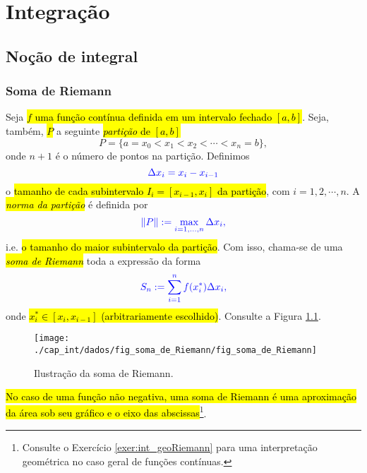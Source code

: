 \chapter{Integração}\label{cap_int}
\thispagestyle{fancy}

\section{Noção de integral}\label{cap_int_sec_nocaoint}

\subsection{Soma de Riemann}

Seja \hl{$f$ uma função contínua definida em um intervalo fechado $[a, b]$}. Seja, também, \hl{$P$} a seguinte \hl{\emph{partição} de $[a, b]$}
\begin{equation}
  P = \{a=x_0<x_1<x_2<\cdots<x_n=b\},
\end{equation}
onde $n+1$ é o número de pontos na partição. Definimos
\begin{equation}
  \color{blue}\Delta x_i = x_{i} - x_{i-1}
\end{equation}
o \hl{tamanho de cada subintervalo $I_{i} = [x_{i-1}, x_{i}]$ da partição}, com $i = 1, 2, \cdots, n$. A \hl{\emph{norma da partição}} é definida por
\begin{equation}
  \color{blue}\|P\| := \max_{i=1, \dotsc, n} \Delta x_i,
\end{equation}
i.e. \hl{o tamanho do maior subintervalo da partição}. Com isso, chama-se de uma \hl{\emph{soma de Riemann}}{\riemann} toda a expressão da forma
\begin{equation}\color{blue}S_n := \sum_{i=1}^n f(x_i^*)\Delta x_i,
\end{equation}
onde \hl{$x_i^*\in [x_i, x_{i-1}]$ (arbitrariamente escolhido)}. Consulte a Figura \ref{fig:soma_de_Riemann}.

\begin{figure}[H]
  \centering
  \texttt{[image: ./cap\_int/dados/fig\_soma\_de\_Riemann/fig\_soma\_de\_Riemann]}
  \caption{Ilustração da soma de Riemann.}
  \label{fig:soma_de_Riemann}
\end{figure}

\hl{No caso de uma função não negativa, uma soma de Riemann é uma aproximação da área sob seu gráfico e o eixo das abscissas}\footnote{Consulte o Exercício \ref{exer:int_geoRiemann} para uma interpretação geométrica no caso geral de funções contínuas.}. 

